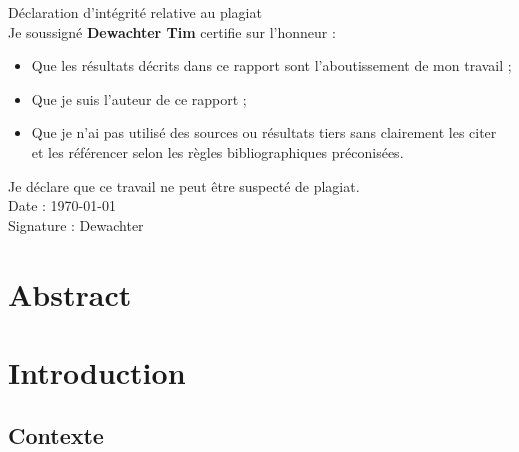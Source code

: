 \documentclass[12pt, a4paper]{article}
\begin{document}
\newpage
\begin{center}
  \vspace*{\fill}

  Déclaration d'intégrité relative au plagiat \\

  

  Je soussigné \textbf{Dewachter Tim} certifie sur l'honneur : \\

  \begin{itemize}
    \centering
    \item Que les résultats décrits dans ce rapport sont l'aboutissement de mon travail ;\\
    \item Que je suis l'auteur de ce rapport ;\\
    \item Que je n'ai pas utilisé des sources ou résultats tiers sans clairement les citer et les référencer selon les règles bibliographiques préconisées.\\
  \end{itemize}

  Je déclare que ce travail ne peut être suspecté de plagiat. \\


  Date : \today\\

  

  Signature : Dewachter

  \vspace*{\fill}
\end{center}
\newpage

\tableofcontents

\newpage

\section{Abstract}


\section{Introduction}

\subsection{Contexte}
\end{document}
